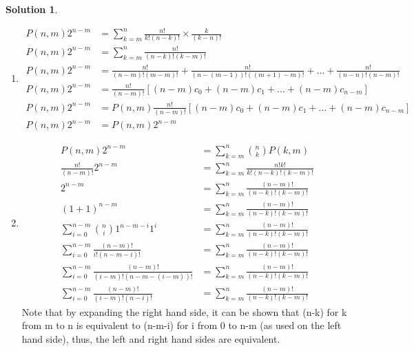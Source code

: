 \documentclass{article}
\theoremstyle{definition}
\newtheorem*{solution}{Solution}
\begin{document}
\begin{solution}
\end{solution}
\begin{enumerate}[label = \alph*)]
    \item
    \begin{align*}
        P(n,m)2^{n-m} &= \sum_{k=m}^n \frac{n!}{k!(n-k)!} \times \frac{k}{(k-n)!}\\
        P(n,m)2^{n-m} &= \sum_{k=m}^n \frac{n!}{(n-k)!(k-m)!}\\
        P(n,m)2^{n-m} &= \frac{n!}{(n-m)!(m-m)!} + \frac{n!}{(n-(m-1))!((m+1)-m)!} + ... + \frac{n!}{(n-n)!(n-m)!}\\
        P(n,m)2^{n-m} &= \frac{n!}{(n-m)!}[(n-m)c_0+(n-m)c_1 + ... + (n-m)c_{n-m}]\\
        P(n,m)2^{n-m} &= P(n,m)\frac{n!}{(n-m)!}[(n-m)c_0+(n-m)c_1 + ... + (n-m)c_{n-m}]\\
        P(n,m)2^{n-m} &= P(n,m)2^{n-m}
    \end{align*}
    
    \item
    \begin{align*}
        P(n,m)2^{n-m} &= \sum_{k=m}^n\binom{n}{k}P(k,m)\\
        \frac{n!}{(n-m)!}2^{n-m} &= \sum_{k=m}^n \frac{n!k!}{k!(n-k)!(k-m)!}\\
        2^{n-m} &= \sum^n_{k=m} \frac{(n-m)!}{(n-k)!(k-m)!}\\
        (1+1)^{n-m} &= \sum^n_{k=m} \frac{(n-m)!}{(n-k)!(k-m)!}\\
        \sum_{i=0}^{n-m} \binom{n}{i}1^{n-m-i}1^i &= \sum^n_{k=m} \frac{(n-m)!}{(n-k)!(k-m)!}\\
        \sum_{i=0}^{n-m}\frac{(n-m)!}{i!(n-m-i)!} &= \sum^n_{k=m} \frac{(n-m)!}{(n-k)!(k-m)!}\\
        \sum_{i=0}^{n-m}\frac{(n-m)!}{(i-m)!(n-m-(i-m))!} &= \sum^n_{k=m} \frac{(n-m)!}{(n-k)!(k-m)!}\\
        \sum_{i=0}^{n-m}\frac{(n-m)!}{(i-m)!(n-i)!} &= \sum^n_{k=m} \frac{(n-m)!}{(n-k)!(k-m)!}
    \end{align*}
    Note that by expanding the right hand side, it can be shown that (n-k) for k from m to n is equivalent to (n-m-i) for i from 0 to n-m (as used on the left hand side), thus, the left and right hand sides are equivalent.
    
    
    
\end{enumerate}
\end{document}
